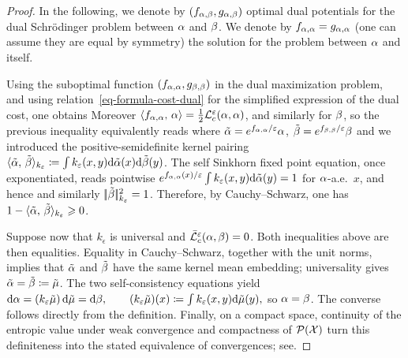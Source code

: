 \begin{proof}
In the following, we denote by $(f_{\alpha,\beta},g_{\alpha,\beta})$ optimal dual potentials for the
dual Schr\"odinger problem between $\alpha$ and $\beta$.
We denote by $f_{\alpha,\alpha}=g_{\alpha,\alpha}$ (one can assume they are equal by symmetry) the solution for the problem between $\alpha$ and itself.

Using the suboptimal function $(f_{\alpha,\alpha},g_{\beta,\beta})$ in the dual maximization problem, and using relation~\eqref{eq-formula-cost-dual} for the simplified expression of the dual cost, one obtains
Moreover $\langle f_{\alpha,\alpha},\,\alpha\rangle = \frac{1}{2}\mathcal{L}_c^\varepsilon(\alpha,\alpha)$, and similarly for $\beta$, so the previous inequality equivalently reads
where $\tilde{\alpha}=e^{f_{\alpha,\alpha}/\varepsilon} \alpha$, $\tilde{\beta}=e^{f_{\beta,\beta}/\varepsilon} \beta$
and we introduced the positive-semidefinite kernel pairing
$\langle \tilde{\alpha},\,\tilde{\beta}\rangle_{k_\varepsilon} \coloneqq \int k_\varepsilon(x,y) \mathrm{d}\tilde{\alpha}(x) \mathrm{d}\tilde{\beta}(y)$.
The self Sinkhorn fixed point equation, once exponentiated, reads pointwise
$e^{f_{\alpha,\alpha}(x)/\varepsilon}\int k_\varepsilon(x,y)\mathrm{d}\tilde{\alpha}(y)=1$ for $\alpha$-a.e.\ $x$,
and hence
and similarly $|\!| \tilde {\beta} |\!|_{k_\varepsilon}^2=1$. Therefore, by Cauchy--Schwarz, one has
$1 - \langle \tilde{\alpha},\,\tilde{\beta}\rangle_{k_\varepsilon} \geqslant 0$.

Suppose now that $k_\epsilon$ is universal and $\bar{\mathcal{L}}_c^\varepsilon(\alpha,\beta)=0$. Both inequalities above are then equalities. Equality in Cauchy--Schwarz, together with the unit norms, implies that $\tilde{\alpha}$ and $\tilde{\beta}$ have the same kernel mean embedding; universality gives $\tilde{\alpha}=\tilde{\beta}\coloneqq\tilde\mu$. The two self-consistency equations yield
\(\mathrm{d}\alpha=(k_\varepsilon\tilde\mu)\,\mathrm{d}\tilde\mu=\mathrm{d}\beta, \qquad (k_\varepsilon\tilde\mu)(x)\coloneqq\int k_\varepsilon(x,y)\mathrm{d}\tilde\mu(y),\)
so $\alpha=\beta$. The converse follows directly from the definition. Finally, on a compact space, continuity of the entropic value under weak convergence and compactness of $\mathcal{P}(\mathcal{X})$ turn this definiteness into the stated equivalence of convergences; see.
\end{proof}
